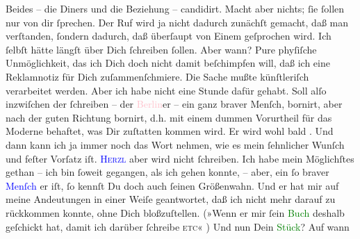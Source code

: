                Beides – die  Diners und die Beziehung –
               candidirt. Macht aber nichts; ſie ſollen nur von dir ſprechen. Der Ruf wird ja nicht
               dadurch zunächſt gemacht, daß man verſtanden, ſondern dadurch, daß überſaupt von
               Einem geſprochen wird. Ich ſelbſt hätte längſt über Dich ſchreiben ſollen. Aber wann?
               Pure phyſiſche Unmöglichkeit, das ich Dich doch nicht damit {\pb}beſchimpfen will, daß ich eine Reklamnotiz für Dich
               zuſammenſchmiere. Die Sache mußte künſtleriſch verarbeitet werden. Aber ich habe
               nicht eine Stunde dafür gehabt. Soll alſo inzwiſchen der \label{K_L02704-12v}\label{K_L02704-12h} ſchreiben – der \textcolor{pink}{Berlin}{}\ledrightnote{\textcolor{pink}{Berlin}}er
               – ein ganz braver Menſch,  bornirt, aber nach der guten Richtung bornirt, d.h. mit einem dummen
               Vorurtheil für das Moderne be{\pb}haftet, was Dir
               zuſtatten kommen wird. Er wird wohl bald \label{K_L02704-13v}\label{K_L02704-13h}. Und dann kann ich ja
               immer noch das Wort nehmen, wie es mein ſehnlicher Wunſch und feſter Vorſatz iſt. \textsc{\textcolor{blue}{Herzl}{}\ledrightnote{\textcolor{blue}{Theodor Herzl}}} aber wird nicht ſchreiben. Ich habe mein Möglichſtes gethan – ich bin ſoweit
               gegangen, als ich gehen konnte, – aber, ein ſo braver \textcolor{blue}{Menſch}{} er iſt, ſo kennſt Du doch auch
               ſeinen {\pb}Größenwahn. Und er hat mir auf meine
               Andeutungen in einer Weiſe geantwortet, daß ich nicht mehr darauf zu rückkommen
               konnte, ohne Dich bloßzuſtellen. (»Wenn er mir ſein \textcolor{green}{Buch}{} deshalb geſchickt hat, damit ich darüber ſchreibe \textsc{etc}« {\dotsfour})\pend
           \pstart
           Und nun Dein \textcolor{green}{Stück}{}? Auf wann
